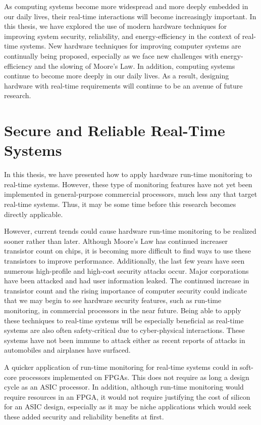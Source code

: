 As computing systems become more widespread and more deeply embedded in our
daily lives, their real-time interactions will become increasingly important.
In this thesis, we have explored the use of modern hardware techniques for
improving system security, reliability, and energy-efficiency in the context of
real-time systems. New hardware techniques for improving computer systems are
continually being proposed, especially as we face new challenges with
energy-efficiency and the slowing of Moore's Law. In addition, computing
systems continue to become more deeply in our daily lives. As a result,
designing hardware with real-time requirements will continue to be an avenue of
future research.

\section{Secure and Reliable Real-Time Systems}

In this thesis, we have presented how to apply hardware run-time monitoring to
real-time systems. However, these type of monitoring features have not yet been
implemented in general-purpose commercial processors, much less any that target
real-time systems. Thus, it may be some time before this research becomes
directly applicable. 

However, current trends could cause hardware run-time monitoring to be realized
sooner rather than later. Although Moore's Law has continued increaser
transistor count on chips, it is becoming more difficult to find ways to use
these transistors to improve performance. Additionally, the last few years have
seen numerous high-profile and high-cost security attacks occur. Major
corporations have been attacked and had user information leaked.  The continued
increase in transistor count and the rising importance of computer security
could indicate that we may begin to see hardware security features, such as
run-time monitoring, in commercial processors in the near future. Being able to
apply these techniques to real-time systems will be especially beneficial as
real-time systems are also often safety-critical due to cyber-physical
interactions. These systems have not been immune to attack either as recent
reports of attacks in automobiles and airplanes have surfaced. 

A quicker application of run-time monitoring for real-time systems could in
soft-core processors implemented on FPGAs. This does not require as long a
design cycle as an ASIC processor. In addition, although run-time monitoring
would require resources in an FPGA, it would not require justifying the cost of
silicon for an ASIC design, especially as it may be niche applications which
would seek these added security and reliability benefits at first.

